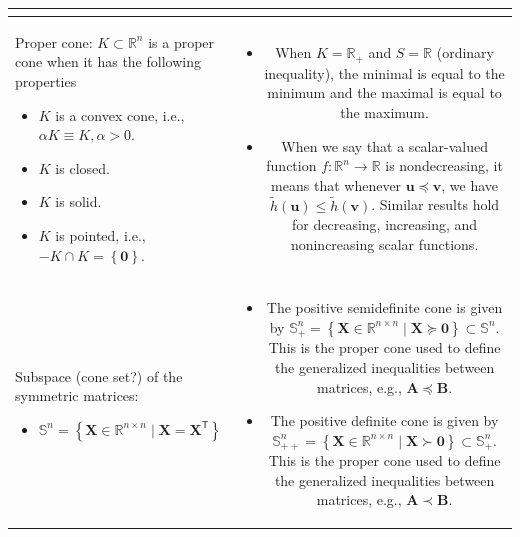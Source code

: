 \documentclass{article}
\begin{document}
\begin{table}[H]
\begin{tabularx}{\textwidth}{|A|C|}
\begin{itemize}[leftmargin=*]
\end{itemize} \\
\hline
Proper cone: \(K \subset \mathbb{R}^{n}\) is a proper cone when it has the following properties
\begin{itemize}
    \item \(K\) is a convex cone, i.e., \(\alpha K \equiv K, \alpha > 0\).
    \item \(K\) is closed.
    \item \(K\) is solid.
    \item \(K\) is pointed, i.e., \(-K \cap K = \left\{ \mathbf{0} \right\}\).
\end{itemize} & \vspace{-3.5ex} \begin{itemize}[leftmargin=*]
    \item When \(K = \mathbb{R}_{+}\) and \(S = \mathbb{R}\) (ordinary inequality), the minimal is equal to the minimum and the maximal is equal to the maximum.
    \item When we say that a scalar-valued function \(f: \mathbb{R}^{n} \rightarrow \mathbb{R}\) is nondecreasing, it means that whenever \(\mathbf{u}\preceq \mathbf{v}\), we have \(\tilde{h}(\mathbf{u})\leq \tilde{h}(\mathbf{v})\). Similar results hold for decreasing, increasing, and nonincreasing scalar functions.
\end{itemize} \\
\hline
Subspace (cone set?) of the symmetric matrices:
\begin{itemize}
    \item \(\mathbb{S}^n = \left\{ \mathbf{X} \in \mathbb{R}^{n\times n} \mid \mathbf{X} = \mathbf{X}^\mathsf{T}\right\}\)
\end{itemize} & \vspace{-3.5ex} \begin{itemize}[leftmargin=*]
    \item The positive semidefinite cone is given by \(\mathbb{S}^n_+ = \left\{ \mathbf{X} \in \mathbb{R}^{n\times n} \mid \mathbf{X} \succeq \mathbf{0} \right\} \subset \mathbb{S}^n\). This is the proper cone used to define the generalized inequalities between matrices, e.g., \(\mathbf{A} \preceq \mathbf{B}\).
    \item The positive definite cone is given by \(\mathbb{S}^n_{++} = \left\{ \mathbf{X} \in \mathbb{R}^{n\times n} \mid \mathbf{X} \succ \mathbf{0} \right\}\subset \mathbb{S}^n_+ \). This is the proper cone used to define the generalized inequalities between matrices, e.g., \(\mathbf{A} \prec \mathbf{B}\).

\end{itemize}
\end{tabularx}
\end{table}
\end{document}
